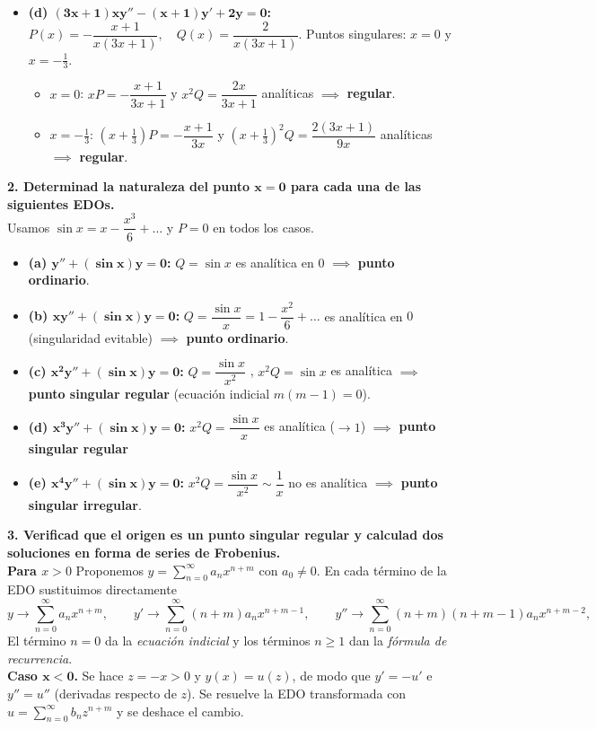 \documentclass[11pt, a4paper]{article}
\begin{document}
\begin{itemize}
\item \textbf{(d) $\bm{(3x+1)xy''-(x+1)y'+2y=0}$:} \\
$P(x)=-\dfrac{x+1}{x(3x+1)}, \quad Q(x)=\dfrac{2}{x(3x+1)}$. Puntos singulares: $x=0$ y $x=-\tfrac13$.
\begin{itemize}
\item $x=0$: $xP=-\dfrac{x+1}{3x+1}$ y $x^2Q=\dfrac{2x}{3x+1}$ analíticas $\implies$ \textbf{regular}.
\item $x=-\tfrac13$: $(x+\tfrac13)P=-\dfrac{x+1}{3x}$ y $(x+\tfrac13)^2Q=\dfrac{2(3x+1)}{9x}$ analíticas $\implies$ \textbf{regular}.
\end{itemize}
\end{itemize}


\noindent\textbf{2. Determinad la naturaleza del punto $\bm{x=0}$ para cada una de las siguientes EDOs.} \\
Usamos $\sin x = x - \dfrac{x^3}{6}+\dots$ y $P=0$ en todos los casos.
\begin{itemize}
\item \textbf{(a) $\bm{y''+(\sin x)y=0}$:} $Q=\sin x$ es analítica en $0$ $\implies$ \textbf{punto ordinario}.
\item \textbf{(b) $\bm{xy''+(\sin x)y=0}$:} $Q=\dfrac{\sin x}{x}=1-\dfrac{x^2}{6}+\dots$ es analítica en $0$ (singularidad evitable) $\implies$ \textbf{punto ordinario}.
\item \textbf{(c) $\bm{x^2y''+(\sin x)y=0}$:} $Q=\dfrac{\sin x}{x^2}$ , $x^2Q=\sin x$ es analítica $\implies$ \textbf{punto singular regular} (ecuación indicial $m(m-1)=0$).
\item \textbf{(d) $\bm{x^3y''+(\sin x)y=0}$:} $x^2Q=\dfrac{\sin x}{x}$ es analítica ($\to1$) $\implies$ \textbf{punto singular regular}
\item \textbf{(e) $\bm{x^4y''+(\sin x)y=0}$:} $x^2Q=\dfrac{\sin x}{x^2}\sim\dfrac1x$ no es analítica $\implies$ \textbf{punto singular irregular}.
\end{itemize}

\noindent\textbf{3. Verificad que el origen es un punto singular regular y calculad dos soluciones en forma de series de Frobenius.} \\
\textbf{Para $x>0$}  Proponemos $y=\sum_{n=0}^\infty a_nx^{n+m}$ con $a_0\neq0$. En cada término de la EDO sustituimos directamente
\[
y\to\sum_{n=0}^\infty a_nx^{n+m},\qquad y'\to\sum_{n=0}^\infty (n+m)a_nx^{n+m-1},\qquad y''\to\sum_{n=0}^\infty (n+m)(n+m-1)a_nx^{n+m-2},
\]
El término $n=0$ da la \emph{ecuación indicial} y los términos $n\geq1$ dan la \emph{fórmula de recurrencia}. \\
\textbf{Caso $\bm{x<0}$.} Se hace $z=-x>0$ y $y(x)=u(z)$, de modo que $y'=-u'$ e $y''=u''$ (derivadas respecto de $z$). Se resuelve la EDO transformada con $u=\sum_{n=0}^\infty b_nz^{n+m}$ y se deshace el cambio.
\end{document}
